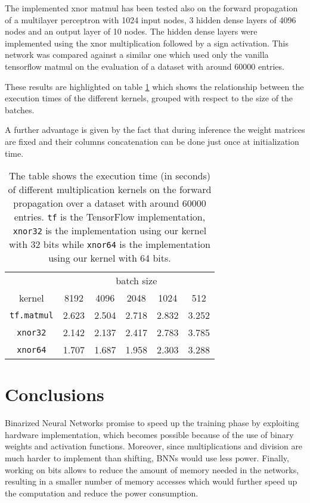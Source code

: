 \documentclass[a4paper]{article}
\numberwithin{equation}{section} %
\numberwithin{figure}{section} %
\numberwithin{table}{section} %
\theoremstyle{definition}
\begin{document}
The implemented xnor matmul has been tested also on the forward propagation of a multilayer perceptron with 1024 input nodes, 3 hidden dense layers of 4096 nodes and an output layer of 10 nodes. The hidden dense layers were implemented using the xnor multiplication followed by a sign activation. 
This network was compared against a similar one which used only the vanilla tensorflow matmul on the evaluation of a dataset with around 60000 entries.

These results are
highlighted on table \ref{table:fp-exec-time} which shows the
relationship between the execution times of the different kernels,
grouped with respect to the size of the batches.

A further advantage is given by the fact that during inference the weight matrices are fixed and their columns concatenation can be done just once at initialization time.

\begin{table}
	\centering
	\begin{tabular}{c|*{5}{c}}
		& \multicolumn{5}{c}{batch size} \\
		kernel & 8192 & 4096 & 2048 & 1024 & 512 \\
		\hline
		\texttt{tf.matmul} & 2.623 & 2.504 & 2.718 & 2.832 & 3.252 \\
		\texttt{xnor32} & 2.142 & 2.137 & 2.417 & 2.783 & 3.785 \\
		\texttt{xnor64} & 1.707 & 1.687 & 1.958 & 2.303 & 3.288 \\
	\end{tabular}
	\caption{
	    The table shows the execution time (in seconds) of different multiplication kernels  on the forward propagation over a dataset with around 60000 entries. \texttt{tf} is the TensorFlow
	    implementation, \texttt{xnor32} is the implementation using our kernel with
	    32 bits while \texttt{xnor64} is the implementation using
	    our kernel with 64 bits.}
    \label{table:fp-exec-time}
\end{table}



\section{Conclusions}

Binarized Neural Networks promise to speed up the training phase by
exploiting hardware implementation, which becomes possible because
of the use of binary weights and activation functions. Moreover, since
multiplications and division are much harder to implement
than shifting, BNNs would use less power. Finally, working on
bits allows to reduce the amount of memory needed in the 
networks, resulting in a smaller number of memory accesses
which would further speed up the computation and reduce
the power consumption.
\end{document}
